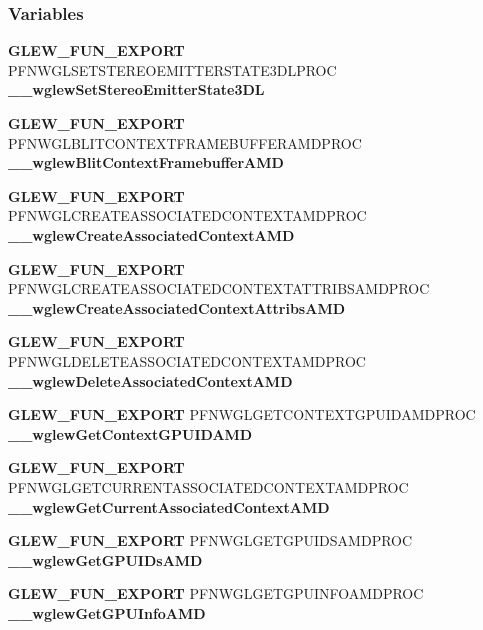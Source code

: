 \subsubsection*{Variables}
\begin{DoxyCompactItemize}
\item 
{\bf G\+L\+E\+W\+\_\+\+F\+U\+N\+\_\+\+E\+X\+P\+O\+RT} P\+F\+N\+W\+G\+L\+S\+E\+T\+S\+T\+E\+R\+E\+O\+E\+M\+I\+T\+T\+E\+R\+S\+T\+A\+T\+E3\+D\+L\+P\+R\+OC {\bf \+\_\+\+\_\+wglew\+Set\+Stereo\+Emitter\+State3\+DL}
\item 
{\bf G\+L\+E\+W\+\_\+\+F\+U\+N\+\_\+\+E\+X\+P\+O\+RT} P\+F\+N\+W\+G\+L\+B\+L\+I\+T\+C\+O\+N\+T\+E\+X\+T\+F\+R\+A\+M\+E\+B\+U\+F\+F\+E\+R\+A\+M\+D\+P\+R\+OC {\bf \+\_\+\+\_\+wglew\+Blit\+Context\+Framebuffer\+A\+MD}
\item 
{\bf G\+L\+E\+W\+\_\+\+F\+U\+N\+\_\+\+E\+X\+P\+O\+RT} P\+F\+N\+W\+G\+L\+C\+R\+E\+A\+T\+E\+A\+S\+S\+O\+C\+I\+A\+T\+E\+D\+C\+O\+N\+T\+E\+X\+T\+A\+M\+D\+P\+R\+OC {\bf \+\_\+\+\_\+wglew\+Create\+Associated\+Context\+A\+MD}
\item 
{\bf G\+L\+E\+W\+\_\+\+F\+U\+N\+\_\+\+E\+X\+P\+O\+RT} P\+F\+N\+W\+G\+L\+C\+R\+E\+A\+T\+E\+A\+S\+S\+O\+C\+I\+A\+T\+E\+D\+C\+O\+N\+T\+E\+X\+T\+A\+T\+T\+R\+I\+B\+S\+A\+M\+D\+P\+R\+OC {\bf \+\_\+\+\_\+wglew\+Create\+Associated\+Context\+Attribs\+A\+MD}
\item 
{\bf G\+L\+E\+W\+\_\+\+F\+U\+N\+\_\+\+E\+X\+P\+O\+RT} P\+F\+N\+W\+G\+L\+D\+E\+L\+E\+T\+E\+A\+S\+S\+O\+C\+I\+A\+T\+E\+D\+C\+O\+N\+T\+E\+X\+T\+A\+M\+D\+P\+R\+OC {\bf \+\_\+\+\_\+wglew\+Delete\+Associated\+Context\+A\+MD}
\item 
{\bf G\+L\+E\+W\+\_\+\+F\+U\+N\+\_\+\+E\+X\+P\+O\+RT} P\+F\+N\+W\+G\+L\+G\+E\+T\+C\+O\+N\+T\+E\+X\+T\+G\+P\+U\+I\+D\+A\+M\+D\+P\+R\+OC {\bf \+\_\+\+\_\+wglew\+Get\+Context\+G\+P\+U\+I\+D\+A\+MD}
\item 
{\bf G\+L\+E\+W\+\_\+\+F\+U\+N\+\_\+\+E\+X\+P\+O\+RT} P\+F\+N\+W\+G\+L\+G\+E\+T\+C\+U\+R\+R\+E\+N\+T\+A\+S\+S\+O\+C\+I\+A\+T\+E\+D\+C\+O\+N\+T\+E\+X\+T\+A\+M\+D\+P\+R\+OC {\bf \+\_\+\+\_\+wglew\+Get\+Current\+Associated\+Context\+A\+MD}
\item 
{\bf G\+L\+E\+W\+\_\+\+F\+U\+N\+\_\+\+E\+X\+P\+O\+RT} P\+F\+N\+W\+G\+L\+G\+E\+T\+G\+P\+U\+I\+D\+S\+A\+M\+D\+P\+R\+OC {\bf \+\_\+\+\_\+wglew\+Get\+G\+P\+U\+I\+Ds\+A\+MD}
\item 
{\bf G\+L\+E\+W\+\_\+\+F\+U\+N\+\_\+\+E\+X\+P\+O\+RT} P\+F\+N\+W\+G\+L\+G\+E\+T\+G\+P\+U\+I\+N\+F\+O\+A\+M\+D\+P\+R\+OC {\bf \+\_\+\+\_\+wglew\+Get\+G\+P\+U\+Info\+A\+MD}
\item 

\end{DoxyCompactItemize}
